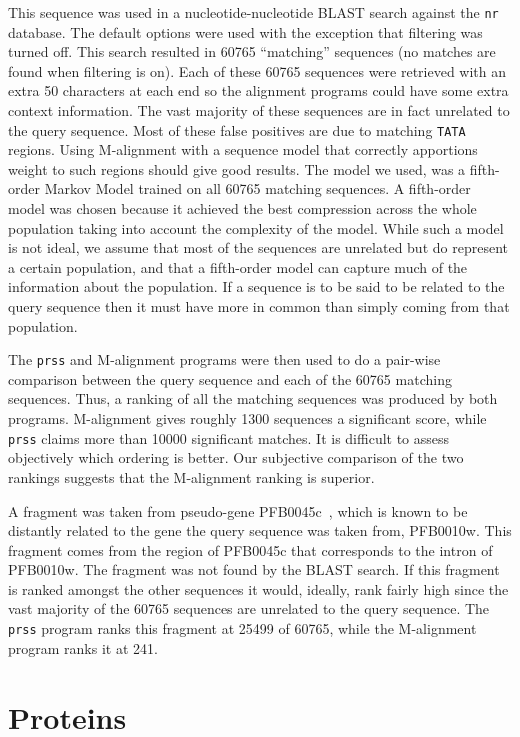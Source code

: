 \documentclass[letterpaper,11pt,oneside]{article}
\begin{document}
\begin{multicols}{2}
This sequence was used in a nucleotide-nucleotide BLAST search against the
\verb!nr! database.  The default options were used with the exception that
filtering was turned off.  This search resulted in 60765 ``matching''
sequences (no matches are found when filtering is on).  Each of these 60765
sequences were retrieved with an extra 50 characters at each end so the
alignment programs could have some extra context information.  The vast
majority of these sequences are in fact unrelated to the query sequence.  Most
of these false positives are due to matching \verb!TATA! regions.  Using
M-alignment with a sequence model that correctly apportions weight to such
regions should give good results.  The model we used, was a fifth-order Markov
Model trained on all 60765 matching sequences.  A fifth-order model was chosen
because it achieved the best compression across the whole population taking
into account the complexity of the model.  While such a model is not ideal, we
assume that most of the sequences are unrelated but do represent a certain
population, and that a fifth-order model can capture much of the information
about the population.  If a sequence is to be said to be related to the query
sequence then it must have more in common than simply coming from that
population.

The \verb!prss! and M-alignment programs were then used to do a pair-wise
comparison between the query sequence and each of the 60765 matching
sequences.  Thus, a ranking of all the matching sequences was produced by both
programs.  M-alignment gives roughly 1300 sequences a significant score, while
\verb!prss! claims more than 10000 significant matches.  It is difficult
to assess objectively which ordering is better.  Our subjective comparison of
the two rankings suggests that the M-alignment ranking is superior.

A fragment was taken from pseudo-gene PFB0045c~\cite{huestis01}, which is
known to be distantly related to the gene the query sequence was taken from,
PFB0010w.  This fragment comes from the region of PFB0045c that corresponds to
the intron of PFB0010w.  The fragment was not found by the BLAST search.  If
this fragment is ranked amongst the other sequences it would, ideally, rank
fairly high since the vast majority of the 60765 sequences are unrelated to
the query sequence.  The \verb!prss! program ranks this fragment at 25499 of
60765, while the M-alignment program ranks it at 241.

\section{Proteins}
\label{sec:proteins}


\end{multicols}
\end{document}
